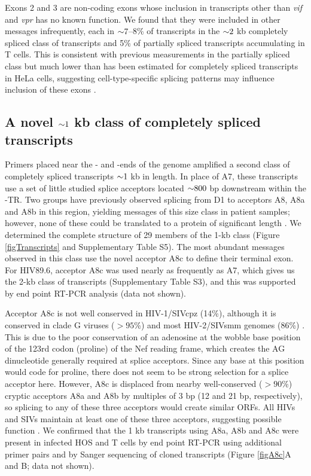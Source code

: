 \documentclass[../sherrill-Mix_thesis.tex]{subfiles}
\begin{document}
Exons 2 and 3 are non-coding exons whose inclusion in transcripts other than \textit{vif} and \textit{vpr} has no known function. We found that they were included in other messages infrequently, each in $\mathord{\sim}{}7$--8\% of transcripts in the $\mathord{\sim}{}2$ kb completely spliced class of transcripts and 5\% of partially spliced transcripts accumulating in T cells. This is consistent with previous measurements in the partially spliced class but much lower than has been estimated for completely spliced transcripts in HeLa cells, suggesting cell-type-specific splicing patterns may influence inclusion of these exons \citep{Purcell1993}. 


\subsection{A novel $\mathord{\sim}{}1$ kb class of completely spliced transcripts}
Primers placed near the \fivePrime{}- and \threePrime{}-ends of the \hivEight{} genome amplified a second class of completely spliced transcripts $\mathord{\sim}{}1$ kb in length. In place of A7, these transcripts use a set of little studied splice acceptors located $\mathord{\sim}{}800$ bp downstream within the \threePrime{}-TR. Two groups have previously observed splicing from D1 to acceptors A8, A8a and A8b in this region, yielding messages of this size class in patient samples; however, none of these could be translated to a protein of significant length \citep{Carrera2010,Smith1992}. We determined the complete structure of 29 members of the 1-kb class (Figure \ref{figTranscripts} and Supplementary Table S5). The most abundant messages observed in this class use the novel acceptor A8c to define their terminal exon. For HIV89.6, acceptor A8c was used nearly as frequently as A7, which gives us the 2-kb class of transcripts (Supplementary Table S3), and this was supported by end point RT-PCR analysis (data not shown).

Acceptor A8c is not well conserved in HIV-1/SIVcpz (14\%), although it is conserved in clade G viruses ($>95$\%) and most HIV-2/SIVsmm genomes (86\%) \citep{Kuiken2010}. This is due to the poor conservation of an adenosine at the wobble base position of the 123rd codon (proline) of the Nef reading frame, which creates the AG dinucleotide generally required at splice acceptors. Since any base at this position would code for proline, there does not seem to be strong selection for a splice acceptor here. However, A8c is displaced from nearby well-conserved ($>90$\%) cryptic acceptors A8a and A8b by multiples of 3 bp (12 and 21 bp, respectively), so splicing to any of these three acceptors would create similar ORFs. All HIVs and SIVs maintain at least one of these three acceptors, suggesting possible function \citep{Kuiken2010}. We confirmed that the 1 kb transcripts using A8a, A8b and A8c were present in infected HOS and T cells by end point RT-PCR using additional primer pairs and by Sanger sequencing of cloned transcripts (Figure \ref{figA8c}A and B; data not shown). 
\end{document}
